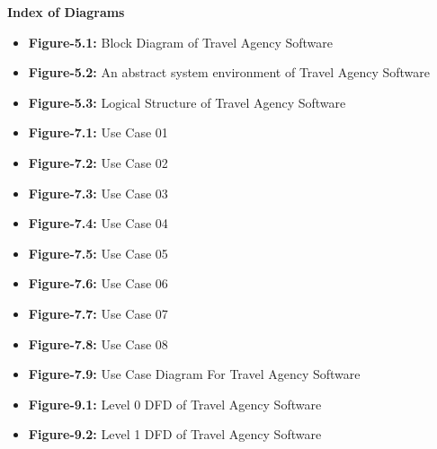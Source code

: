 \documentclass{scrreprt}
\begin{document}
\tableofcontents
\begin{center}
    \parbox{0.8\textwidth}{ 
        \centering
        \begin{center}
            \parbox{0.8\textwidth}{ 
                \centering
                \textbf{Index of Diagrams}
            }
        \end{center}

        \begin{itemize}
            \item \textbf{Figure-5.1:} Block Diagram of Travel Agency Software 
            \item \textbf{Figure-5.2:} An abstract system environment of Travel Agency Software 
            \item \textbf{Figure-5.3:} Logical Structure of Travel Agency Software 
            \item \textbf{Figure-7.1:} Use Case 01 
            \item \textbf{Figure-7.2:} Use Case 02 
            \item \textbf{Figure-7.3:} Use Case 03 
            \item \textbf{Figure-7.4:} Use Case 04 
            \item \textbf{Figure-7.5:} Use Case 05 
            \item \textbf{Figure-7.6:} Use Case 06 
            \item \textbf{Figure-7.7:} Use Case 07 
            \item \textbf{Figure-7.8:} Use Case 08 
            \item \textbf{Figure-7.9:} Use Case Diagram For Travel Agency Software 
            \item \textbf{Figure-9.1:} Level 0 DFD of Travel Agency Software 
            \item \textbf{Figure-9.2:} Level 1 DFD of Travel Agency Software 
        \end{itemize}
        
}
\end{center}
\end{document}
